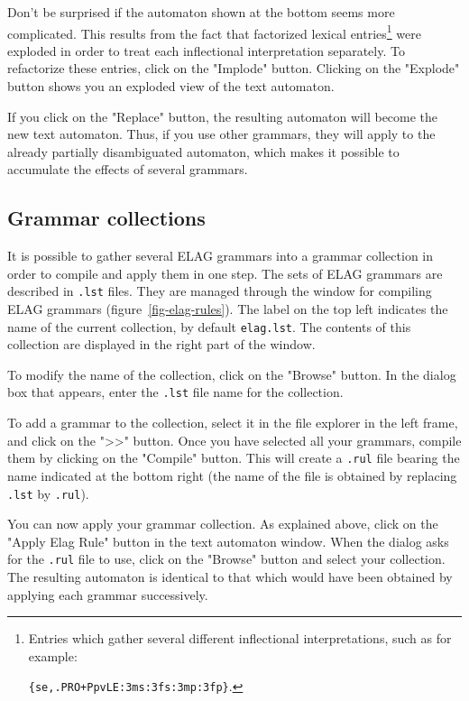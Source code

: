 \clearpage

\bigskip
\noindent Don't be surprised if the automaton shown at the bottom seems more complicated.
This results from the fact that factorized lexical entries\footnote{Entries which
gather several different inflectional interpretations, such as for example:

\texttt{\{se,.PRO+PpvLE:3ms:3fs:3mp:3fp\}}.}
were exploded in order to treat each inflectional interpretation separately. To
refactorize these entries, click on the "Implode" button. Clicking on the
"Explode" button shows you an exploded view of the text automaton.

\bigskip
\noindent If you click on the "Replace" button, the resulting automaton will
become the new text automaton. Thus, if you use other grammars, they will apply to the
already partially disambiguated automaton, which makes it possible to accumulate
the effects of several grammars.


\subsection{Grammar collections}
It is possible to gather several ELAG grammars into a grammar collection in order
to compile and apply them in one step. The sets of ELAG grammars are described in
\verb+.lst+ files. They are managed through the window
for compiling ELAG grammars (figure~\ref{fig-elag-rules}). The label on the top
left indicates the name of the current collection, by default \verb+elag.lst+.
The contents of this collection are displayed in the right part of the window.

\bigskip
\noindent To modify the name of the collection, click on the "Browse" button.
In the dialog box that appears, enter the \verb+.lst+ file name for the collection.

\bigskip
\noindent To add a grammar to the collection, select it in the file explorer in the left
frame, and click on the ">>" button. Once you have selected all your grammars,
compile them by clicking on the "Compile" button. This will create a
\verb+.rul+ file bearing the name indicated at the bottom right (the name of the file is
obtained by replacing \verb+.lst+ by \verb+.rul+).

\bigskip
\noindent You can now apply your grammar collection. As explained above, click on the
"Apply Elag Rule" button in the text automaton window. When the dialog asks for
the \verb+.rul+ file to use, click on the "Browse" button and select your
collection. The resulting automaton is identical to that which would have been
obtained by applying each grammar successively.

